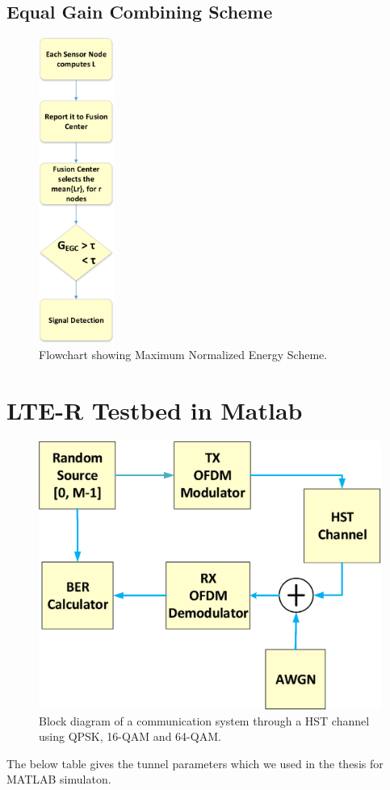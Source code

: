 \subsection{Equal Gain Combining Scheme}
\begin{figure}[ht!]
	\centering
	\includegraphics[width=\textwidth,height=10cm,keepaspectratio]{images/Gill/figs/egcscheme.eps}
\caption{Flowchart showing Maximum Normalized Energy Scheme.} 
\label{egcscheme}      
\end{figure}

\section{LTE-R Testbed in Matlab}

\begin{figure}[!ht]
\label{finalblock}
\centering
\includegraphics[width=\linewidth,keepaspectratio]{images/Gill/lte_figs/finalblock.eps} 
\caption{Block diagram of a communication system through a HST channel using QPSK, 16-QAM and 64-QAM.}
\end{figure}
The below table gives the tunnel parameters which we used in the thesis for MATLAB simulaton.

